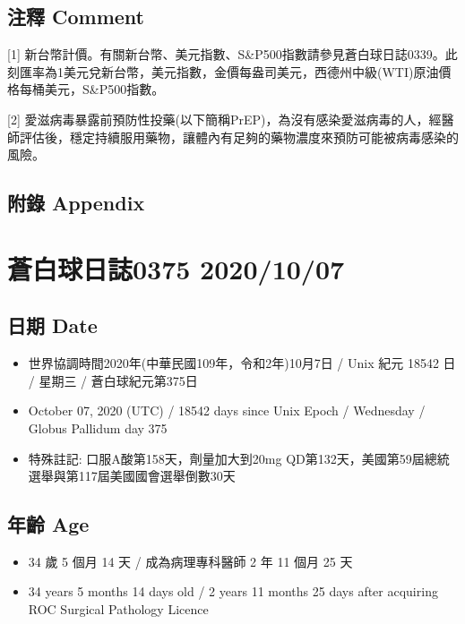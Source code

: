 \documentclass[
]{article}
\providecommand{\tightlist}{%
  \setlength{\itemsep}{0pt}\setlength{\parskip}{0pt}}
\begin{document}
\hypertarget{ux6ce8ux91cb-comment-5}{%
\subsection{注釋 Comment}\label{ux6ce8ux91cb-comment-5}}

{[}1{]}
新台幣計價。有關新台幣、美元指數、S\&P500指數請參見蒼白球日誌0339。此刻匯率為1美元兌新台幣，美元指數，金價每盎司美元，西德州中級(WTI)原油價格每桶美元，S\&P500指數。

{[}2{]}
愛滋病毒暴露前預防性投藥(以下簡稱PrEP)，為沒有感染愛滋病毒的人，經醫師評估後，穩定持續服用藥物，讓體內有足夠的藥物濃度來預防可能被病毒感染的風險。

\hypertarget{ux9644ux9304-appendix-5}{%
\subsection{附錄 Appendix}\label{ux9644ux9304-appendix-5}}

\hypertarget{ux84bcux767dux7403ux65e5ux8a8c0375-20201007}{%
\section{蒼白球日誌0375
2020/10/07}\label{ux84bcux767dux7403ux65e5ux8a8c0375-20201007}}

\hypertarget{ux65e5ux671f-date-6}{%
\subsection{日期 Date}\label{ux65e5ux671f-date-6}}

\begin{itemize}
\tightlist
\item
  世界協調時間2020年(中華民國109年，令和2年)10月7日 / Unix 紀元 18542 日
  / 星期三 / 蒼白球紀元第375日
\item
  October 07, 2020 (UTC) / 18542 days since Unix Epoch / Wednesday /
  Globus Pallidum day 375
\item
  特殊註記: 口服A酸第158天，劑量加大到20mg
  QD第132天，美國第59屆總統選舉與第117屆美國國會選舉倒數30天
\end{itemize}

\hypertarget{ux5e74ux9f61-age-6}{%
\subsection{年齡 Age}\label{ux5e74ux9f61-age-6}}

\begin{itemize}
\tightlist
\item
  34 歲 5 個月 14 天 / 成為病理專科醫師 2 年 11 個月 25 天
\item
  34 years 5 months 14 days old / 2 years 11 months 25 days after
  acquiring ROC Surgical Pathology Licence
\end{itemize}
\end{document}

